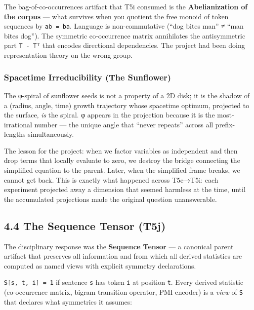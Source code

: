 \documentclass[
  twocolumn,
  10pt,
  a4paper]{article}
\begin{document}
The bag-of-co-occurrences artifact that T5i consumed is the
\textbf{Abelianization of the corpus} --- what survives when you
quotient the free monoid of token sequences by \texttt{ab\ =\ ba}.
Language is non-commutative (``dog bites man'' ≠ ``man bites dog''). The
symmetric co-occurrence matrix annihilates the antisymmetric part
\texttt{T\ -\ Tᵀ} that encodes directional dependencies. The project had
been doing representation theory on the wrong group.

\hypertarget{spacetime-irreducibility-the-sunflower}{%
\subsubsection{Spacetime Irreducibility (The
Sunflower)}\label{spacetime-irreducibility-the-sunflower}}

The φ-spiral of sunflower seeds is not a property of a 2D disk; it is
the shadow of a (radius, angle, time) growth trajectory whose spacetime
optimum, projected to the surface, \emph{is} the spiral. φ appears in
the projection because it is the most-irrational number --- the unique
angle that ``never repeats'' across all prefix-lengths simultaneously.

The lesson for the project: when we factor variables as independent and
then drop terms that locally evaluate to zero, we destroy the bridge
connecting the simplified equation to the parent. Later, when the
simplified frame breaks, we cannot get back. This is exactly what
happened across T5e→T5i: each experiment projected away a dimension that
seemed harmless at the time, until the accumulated projections made the
original question unanswerable.

\hypertarget{the-sequence-tensor-t5j}{%
\subsection{4.4 The Sequence Tensor
(T5j)}\label{the-sequence-tensor-t5j}}

The disciplinary response was the \textbf{Sequence Tensor} --- a
canonical parent artifact that preserves all information and from which
all derived statistics are computed as named views with explicit
symmetry declarations.

\texttt{S{[}s,\ t,\ i{]}\ =\ 1} if sentence \texttt{s} has token
\texttt{i} at position \texttt{t}. Every derived statistic
(co-occurrence matrix, bigram transition operator, PMI encoder) is a
\emph{view} of \texttt{S} that declares what symmetries it assumes:
\end{document}
